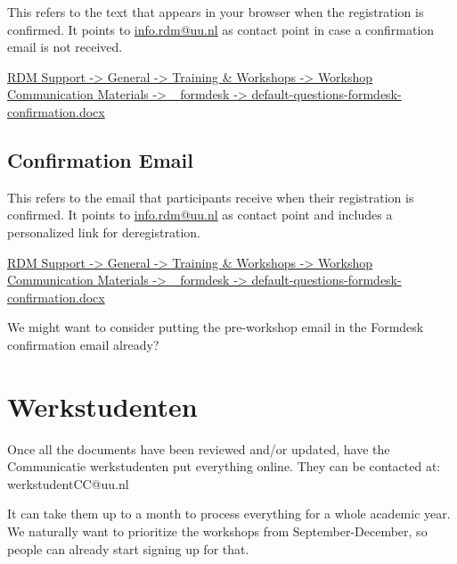 \documentclass[
  letterpaper,
  DIV=11,
  numbers=noendperiod]{scrreprt}
\begin{document}
This refers to the text that appears in your browser when the
registration is confirmed. It points to \url{info.rdm@uu.nl} as contact
point in case a confirmation email is not received.

\href{https://solisservices.sharepoint.com/:w:/r/sites/RDMSpeeltuin/Shared\%20Documents/General/Trainings\%20and\%20Workshops/Workshop\%20Communication\%20Materials/_formdesk/default-formdesk-confirmation.docx?d=wee2a03a810e74d40aeea4e8cb1e5be6b&csf=1&web=1&e=PBbgGp}{RDM
Support -\textgreater{} General -\textgreater{} Training \& Workshops
-\textgreater{} Workshop Communication Materials -\textgreater{}
\_formdesk -\textgreater{} default-questions-formdesk-confirmation.docx}

\subsection*{Confirmation Email}\label{confirmation-email}

This refers to the email that participants receive when their
registration is confirmed. It points to \url{info.rdm@uu.nl} as contact
point and includes a personalized link for deregistration.

\href{https://solisservices.sharepoint.com/:w:/r/sites/RDMSpeeltuin/Shared\%20Documents/General/Trainings\%20and\%20Workshops/Workshop\%20Communication\%20Materials/_formdesk/default-formdesk-confirmation.docx?d=wee2a03a810e74d40aeea4e8cb1e5be6b&csf=1&web=1&e=PBbgGp}{RDM
Support -\textgreater{} General -\textgreater{} Training \& Workshops
-\textgreater{} Workshop Communication Materials -\textgreater{}
\_formdesk -\textgreater{} default-questions-formdesk-confirmation.docx}

We might want to consider putting the pre-workshop email in the Formdesk
confirmation email already?

\section*{Werkstudenten}\label{werkstudenten}


Once all the documents have been reviewed and/or updated, have the
Communicatie werkstudenten put everything online. They can be contacted
at: werkstudentCC@uu.nl

It can take them up to a month to process everything for a whole
academic year. We naturally want to prioritize the workshops from
September-December, so people can already start signing up for that.
\end{document}
